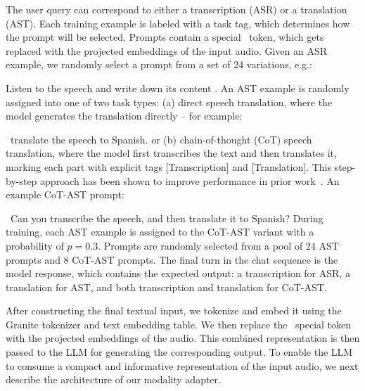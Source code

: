 \documentclass[9pt,conference]{IEEEtran}
\newcommand{\audiosym}{{\tt <|audio|>}}
\renewenvironment{quote}
  {\list{}{\leftmargin=1em \rightmargin=0.1em}\item\relax\small\ttfamily}
  {\endlist}
\begin{document}
The user query can correspond to either a transcription (ASR) or a translation (AST). Each training example is labeled with a task tag, which determines how the prompt will be selected. 
Prompts contain a special \audiosym\ token, which gets replaced with the projected embeddings of the input audio. 
Given an ASR example, we randomly select a prompt from a set of 24 variations, e.g.: 
\begin{quote}
Listen to the speech and write down its content \audiosym.
\end{quote}
An AST example is randomly assigned into one of two task types: (a) direct speech translation, where the model generates the translation directly -- for example: 
\begin{quote}
\audiosym\ translate the speech to Spanish.
\end{quote}
or (b) chain-of-thought (CoT) speech translation, where the model first transcribes the text and then translates it, marking each part with explicit tags [Transcription] and [Translation]. This step-by-step approach has been shown to improve performance in prior work~\cite{abouelenin2025phi}. An example CoT-AST prompt:
\begin{quote}
\audiosym\ Can you transcribe the speech, and then translate it to Spanish?
\end{quote}
During training, each AST example is assigned to the CoT-AST variant with a probability of $p = 0.3$. 
Prompts are randomly selected from a pool of 24 AST prompts and 8 CoT-AST prompts.
The final turn in the chat sequence is the model response, which contains the expected output: a transcription for ASR, a translation for AST, and both transcription and translation for CoT-AST. 

After constructing the final textual input, we tokenize and embed it using the Granite tokenizer and text embedding table.
We then replace the \audiosym\ special token with the projected embeddings of the audio.
This combined representation is then passed to the LLM for generating the corresponding output.
To enable the LLM to consume a compact and informative representation of the input audio, we next describe the architecture of our modality adapter.
\end{document}

